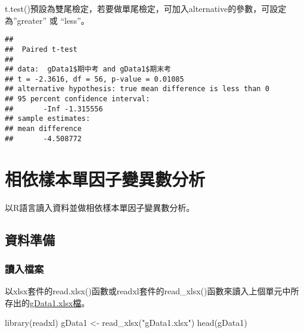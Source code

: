 \documentclass[
]{book}
\newenvironment{Shaded}{\begin{snugshade}}{\end{snugshade}}
\newcommand{\AttributeTok}[1]{\textcolor[rgb]{0.77,0.63,0.00}{#1}}
\newcommand{\ConstantTok}[1]{\textcolor[rgb]{0.00,0.00,0.00}{#1}}
\newcommand{\FunctionTok}[1]{\textcolor[rgb]{0.00,0.00,0.00}{#1}}
\newcommand{\NormalTok}[1]{#1}
\newcommand{\OtherTok}[1]{\textcolor[rgb]{0.56,0.35,0.01}{#1}}
\newcommand{\SpecialCharTok}[1]{\textcolor[rgb]{0.00,0.00,0.00}{#1}}
\newcommand{\StringTok}[1]{\textcolor[rgb]{0.31,0.60,0.02}{#1}}
\begin{document}
t.test()預設為雙尾檢定，若要做單尾檢定，可加入alternative的參數，可設定為''greater'' 或 ``less''。

\begin{Shaded}
\end{Shaded}

\begin{verbatim}
## 
##  Paired t-test
## 
## data:  gData1$期中考 and gData1$期末考
## t = -2.3616, df = 56, p-value = 0.01085
## alternative hypothesis: true mean difference is less than 0
## 95 percent confidence interval:
##       -Inf -1.315556
## sample estimates:
## mean difference 
##       -4.508772
\end{verbatim}

\hypertarget{within1way}{%
\chapter{相依樣本單因子變異數分析}\label{within1way}}

以R語言讀入資料並做相依樣本單因子變異數分析。

\hypertarget{ux8cc7ux6599ux6e96ux5099}{%
\section{資料準備}\label{ux8cc7ux6599ux6e96ux5099}}

\hypertarget{ux8b80ux5165ux6a94ux6848-3}{%
\subsection{讀入檔案}\label{ux8b80ux5165ux6a94ux6848-3}}

以xlsx套件的read.xlsx()函數或readxl套件的read\_xlsx()函數來讀入上個單元中所存出的\href{https://docs.google.com/spreadsheets/d/1qx6T0brgzuigBpS0p-Wq8hVSFFku9ebV/edit\#gid=390389518}{gData1.xlsx檔}。

\begin{Shaded}
\begin{Highlighting}[]
\FunctionTok{library}\NormalTok{(readxl)}
\NormalTok{gData1 }\OtherTok{\textless{}{-}} \FunctionTok{read\_xlsx}\NormalTok{(}\StringTok{"gData1.xlsx"}\NormalTok{)}
\FunctionTok{head}\NormalTok{(gData1)}
\end{Highlighting}
\end{Shaded}
\end{document}
